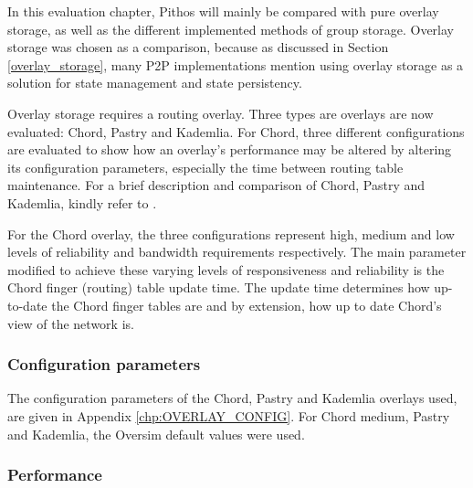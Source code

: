 In this evaluation chapter, Pithos will mainly be compared with pure overlay storage, as well as the different implemented methods of group storage. Overlay storage was chosen as a comparison, because as discussed in Section \ref{overlay_storage}, many P2P implementations mention using overlay storage as a solution for state management and state persistency.

Overlay storage requires a routing overlay. Three types are overlays are now evaluated: Chord, Pastry and Kademlia. For Chord, three different configurations are evaluated to show how an overlay's performance may be altered by altering its configuration parameters, especially the time between routing table maintenance. For a brief description and comparison of Chord, Pastry and Kademlia, kindly refer to \cite{overlay_survey}.

For the Chord overlay, the three configurations represent high, medium and low levels of reliability and bandwidth requirements respectively. The main parameter modified to achieve these varying levels of responsiveness and reliability is the Chord finger (routing) table update time. The update time determines how up-to-date the Chord finger tables are and by extension, how up to date Chord's view of the network is.

\subsubsection{Configuration parameters}

The configuration parameters of the Chord, Pastry and Kademlia overlays used, are given in Appendix \ref{chp:OVERLAY_CONFIG}. For Chord medium, Pastry and Kademlia, the Oversim default values were used.

\subsubsection{Performance}

